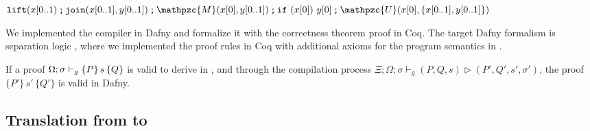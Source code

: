 {\footnotesize
\begin{center}
${\sseq{\texttt{lift}(x[0..1)}{\sseq{\texttt{join}(x[0..1],y[0..1])}{\sseq{\sseq{\mathpzc{M}(x[0],y[0..1])}{\sifq{x[0]}{y[0]}}}{\mathpzc{U}(x[0],\{x[0..1],y[0..1]\})}}}}$
\end{center}
}

We implemented the compiler in Dafny and formalize it with the correctness theorem proof in Coq. The target Dafny formalism is separation logic \cite{separationlogic}, where we implemented the proof rules in Coq 
with additional axioms for the \qafny program semantics in .

\begin{theorem}\label{thm:proof-compile-dafny}\rm 
If a proof $\Omega;\sigma\vdash_{g}\{P\}\, s \,\{Q\}$ is valid to derive in \qafny, and through the compilation process $\Xi;\Omega;\sigma\vdash_g (P,Q,s) \triangleright (P',Q',s',\sigma')$, the proof $\{P'\} \, s' \,\{Q'\}$ is valid in Dafny.
\end{theorem}

\subsection{Translation from \qafny to \sqir}\label{sec:vqir-compilation}

\newcommand{\tget}{\texttt{get}}
\newcommand{\tstart}{\texttt{start}}
\newcommand{\tfst}{\texttt{fst}}
\newcommand{\tsnd}{\texttt{snd}}
\newcommand{\tucom}[1]{\texttt{ucom}~{#1}}
\newcommand{\tif}{\texttt{if}}
\newcommand{\tthen}{\texttt{then}}
\newcommand{\telse}{\texttt{else}}
\newcommand{\tlet}{\texttt{let}}
\newcommand{\tin}{\texttt{in}}

